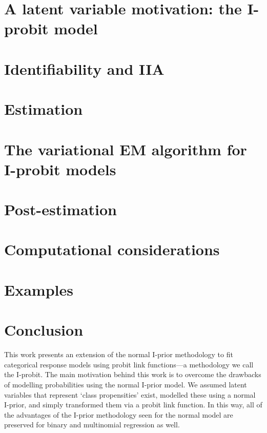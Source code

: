 \documentclass[a4paper,showframe,11pt]{report}
\begin{document}
%

\section{A latent variable motivation: the I-probit model}


\section{Identifiability and IIA}\label{sec:iia}


\section{Estimation}


\section{The variational EM algorithm for I-probit models}\label{sec:iprobitvar}


\section{Post-estimation}\label{sec:iprobitpostest}


\section{Computational considerations}


\section{Examples}
\label{sec:iprobiteg}


\section{Conclusion}

This work presents an extension of the normal I-prior methodology to fit categorical response models using probit link functions---a methodology we call the I-probit.
The main motivation behind this work is to overcome the drawbacks of modelling probabilities using the normal I-prior model.
We assumed latent variables that represent `class propensities' exist, modelled these using a normal I-prior, and simply transformed them via a probit link function.
In this way, all of the advantages of the I-prior methodology seen for the normal model are preserved for binary and multinomial regression as well.
\end{document}
